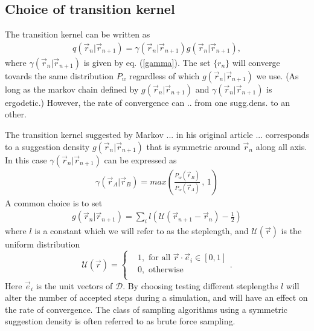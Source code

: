 \documentclass[a4paper,10pt,twocolumn]{article} %
\begin{document}

\subsection{Choice of transition kernel} %

The transition kernel can be written as
\begin{align}
	q(\vec r_n|\vec r_{n+1}) = \gamma(\vec r_n|\vec r_{n+1}) g(\vec r_n|\vec r_{n+1}), 
\end{align}
where $\gamma(\vec r_{n}|\vec r_{n+1})$ is given by eq. (\ref{gamma}). 
The set $\{r_n\}$ will converge tovards the same distribution $P_w$ regardless of which $g(\vec r_n|\vec r_{n+1})$ we use. 
(As long as the markov chain defined by $g(\vec r_n|\vec r_{n+1})$ and $\gamma(\vec r_n|\vec r_{n+1})$ is ergodetic.)
However, the rate of convergence can .. from one sugg.dens. to an other.

The transition kernel suggested by Markov ... in his original article ... corresponds to a suggestion density $g(\vec r_n|\vec r_{n+1})$ 
that is symmetric around $\vec r_n$ along all axis. In this case $\gamma(\vec r_n|\vec r_{n+1})$ can be expressed as
\begin{align} 
	\gamma(\vec r_A|\vec r_B)=max\left(
	\frac
	{P_w(\vec r_B)}
    {P_w(\vec r_A)}\, 
	,\, 1 \right) \label{gamma_bruteforce}
\end{align}
A common choice is to set
\begin{align}
	g(\vec r_n|\vec r_{n+1}) = \sum_i l\left(\mathcal U(\vec r_{n+1}-\vec r_n) - \frac12\right)
\end{align}
where $l$ is a constant which we will refer to as the steplength, and $\mathcal U(\vec r)$ is the uniform distribution
\begin{equation}
	\mathcal U(\vec r) = \left\{ 
	\begin{split} 
		&1, \text{ for all } \vec r \cdot \vec e_i \in [0,1]\\
		&0, \text{ otherwise }\\
	\end{split}
	\right..
\end{equation} 
Here $\vec e_i$ is the unit vectors of $\mathcal D$. 
By choosing testing different steplengths $l$ will alter the number of 
accepted steps during a simulation, and will have an effect on the rate of convergence. %
The class of sampling algorithms using a symmetric suggestion density is often referred to as brute force sampling.
\end{document}
